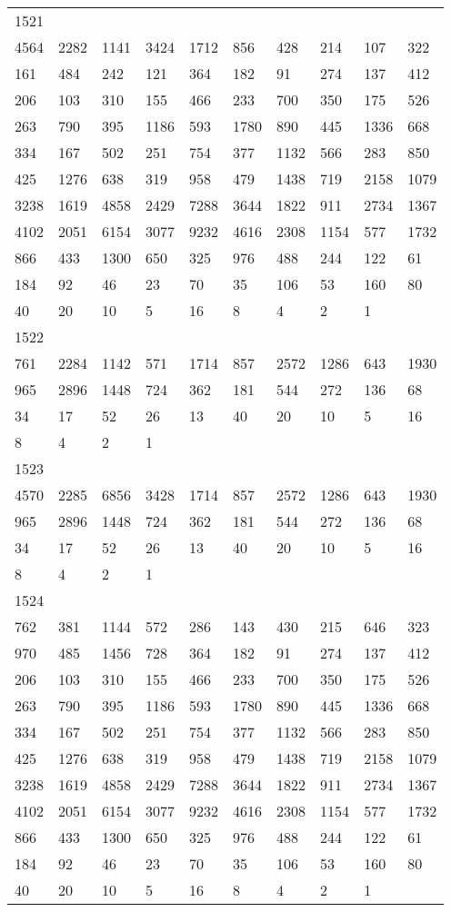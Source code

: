 \begin{longtable}{*{10}{l}}
1521&&&&&&&&&\\
4564& 2282& 1141& 3424& 1712& 856& 428& 214& 107& 322\\
161& 484& 242& 121& 364& 182& 91& 274& 137& 412\\
206& 103& 310& 155& 466& 233& 700& 350& 175& 526\\
263& 790& 395& 1186& 593& 1780& 890& 445& 1336& 668\\
334& 167& 502& 251& 754& 377& 1132& 566& 283& 850\\
425& 1276& 638& 319& 958& 479& 1438& 719& 2158& 1079\\
3238& 1619& 4858& 2429& 7288& 3644& 1822& 911& 2734& 1367\\
4102& 2051& 6154& 3077& 9232& 4616& 2308& 1154& 577& 1732\\
866& 433& 1300& 650& 325& 976& 488& 244& 122& 61\\
184& 92& 46& 23& 70& 35& 106& 53& 160& 80\\
40& 20& 10& 5& 16& 8& 4& 2& 1& \\

1522&&&&&&&&&\\
761& 2284& 1142& 571& 1714& 857& 2572& 1286& 643& 1930\\
965& 2896& 1448& 724& 362& 181& 544& 272& 136& 68\\
34& 17& 52& 26& 13& 40& 20& 10& 5& 16\\
8& 4& 2& 1& \\

1523&&&&&&&&&\\
4570& 2285& 6856& 3428& 1714& 857& 2572& 1286& 643& 1930\\
965& 2896& 1448& 724& 362& 181& 544& 272& 136& 68\\
34& 17& 52& 26& 13& 40& 20& 10& 5& 16\\
8& 4& 2& 1& \\

1524&&&&&&&&&\\
762& 381& 1144& 572& 286& 143& 430& 215& 646& 323\\
970& 485& 1456& 728& 364& 182& 91& 274& 137& 412\\
206& 103& 310& 155& 466& 233& 700& 350& 175& 526\\
263& 790& 395& 1186& 593& 1780& 890& 445& 1336& 668\\
334& 167& 502& 251& 754& 377& 1132& 566& 283& 850\\
425& 1276& 638& 319& 958& 479& 1438& 719& 2158& 1079\\
3238& 1619& 4858& 2429& 7288& 3644& 1822& 911& 2734& 1367\\
4102& 2051& 6154& 3077& 9232& 4616& 2308& 1154& 577& 1732\\
866& 433& 1300& 650& 325& 976& 488& 244& 122& 61\\
184& 92& 46& 23& 70& 35& 106& 53& 160& 80\\
40& 20& 10& 5& 16& 8& 4& 2& 1& \\


\end{longtable}
